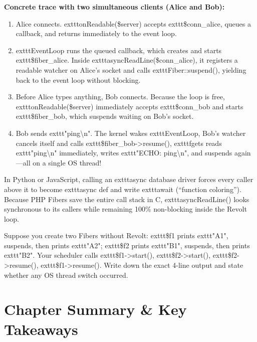\textbf{Concrete trace with two simultaneous clients (Alice and Bob):}
\begin{enumerate}[leftmargin=15pt]
  \item Alice connects. 	exttt{onReadable(\$server)} accepts 	exttt{\$conn\_alice}, queues a callback, and returns immediately to the event loop.
  \item 	exttt{EventLoop} runs the queued callback, which creates and starts 	exttt{\$fiber\_alice}. Inside 	exttt{asyncReadLine(\$conn\_alice)}, it registers a readable watcher on Alice's socket and calls 	exttt{Fiber::suspend()}, yielding back to the event loop without blocking.
  \item Before Alice types anything, Bob connects. Because the loop is free, 	exttt{onReadable(\$server)} immediately accepts 	exttt{\$conn\_bob} and starts 	exttt{\$fiber\_bob}, which suspends waiting on Bob's socket.
  \item Bob sends 	exttt{"ping\textbackslash n"}. The kernel wakes 	exttt{EventLoop}, Bob's watcher cancels itself and calls 	exttt{\$fiber\_bob->resume()}, 	exttt{fgets} reads 	exttt{"ping\textbackslash n"} immediately, writes 	exttt{"ECHO: ping\textbackslash n"}, and suspends again---all on a single OS thread!
\end{enumerate}

\begin{intuitionbox}
In Python or JavaScript, calling an 	exttt{async} database driver forces every caller above it to become 	exttt{async def} and write 	exttt{await} (``function coloring''). Because PHP Fibers save the entire call stack in C, 	exttt{asyncReadLine()} looks synchronous to its callers while remaining 100\% non-blocking inside the Revolt loop.
\end{intuitionbox}

\begin{tryityourselfbox}
Suppose you create two Fibers without Revolt: 	exttt{\$f1} prints 	exttt{"A1"}, suspends, then prints 	exttt{"A2"}; 	exttt{\$f2} prints 	exttt{"B1"}, suspends, then prints 	exttt{"B2"}. Your scheduler calls 	exttt{\$f1->start()}, 	exttt{\$f2->start()}, 	exttt{\$f2->resume()}, 	exttt{\$f1->resume()}. Write down the exact 4-line output and state whether any OS thread switch occurred.
\end{tryityourselfbox}

\section{Chapter Summary \protect\& Key Takeaways}


